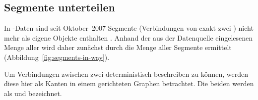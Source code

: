 \documentclass[../main/thesis.tex]{subfiles}
\begin{document}



\subsection{Segmente unterteilen}
\label{ch:split-algorithm}

In \osm-Daten sind seit Oktober~2007 Segmente (Verbindungen von exakt zwei ) nicht mehr als eigene Objekte enthalten .
Anhand der aus der Datenquelle eingelesenen Menge aller  wird daher zunächst durch  die Menge aller Segmente ermittelt (Abbildung~\ref{fig:segments-in-way}).


Um Verbindungen zwischen zwei  deterministisch beschreiben zu können, werden diese hier als Kanten in einem gerichteten Graphen betrachtet.
Die beiden  werden als  und  bezeichnet.
\end{document}
